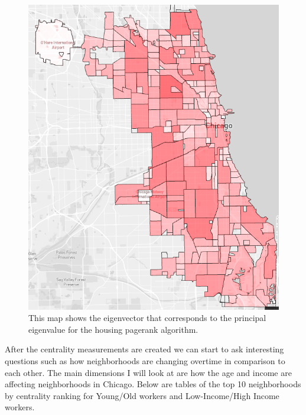 \documentclass{article}
\theoremstyle{definition}
\theoremstyle{remark}
\begin{document}
\begin{figure}[H]
    \centering
    \includegraphics[width=1.0\textwidth]{Houses-S000-2015}
    \caption{This map shows the eigenvector that corresponds to the principal eigenvalue for the housing pagerank algorithm.}
    \label{fig:Houses-S000-2015}
\end{figure}

After the centrality measurements are created we can start to ask interesting questions such as how neighborhoods are changing overtime in comparison to each other.  The main dimensions I will look at are how the age and income are affecting neighborhoods in Chicago.  Below are tables of the top 10 neighborhoods by centrality ranking for Young/Old workers and Low-Income/High Income workers.\\
\end{document}
